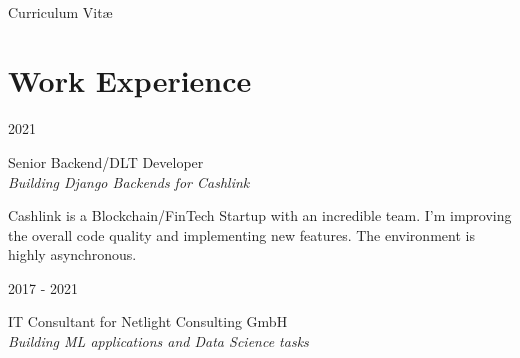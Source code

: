 \documentclass[a4paper,10pt]{article} %
\begin{document}
\color{text1} %


\par{\\ %
{\Huge \color{headings} Curriculum {Vit\ae}\\[15pt]\par}


\begin{minipage}[t]{0.5\textwidth}
\vspace{0pt} %


\section{Work Experience}

{\raggedleft\textsc{2021}\par}

{\raggedright\large Senior Backend/DLT Developer\\
\textit{Building Django Backends for Cashlink}\\[5pt]}

\normalsize{Cashlink is a Blockchain/FinTech Startup with an incredible team.
I'm improving the overall code quality and implementing new features. The 
environment is highly asynchronous.}\\


{\raggedleft\textsc{2017 - 2021}\par}

{\raggedright\large IT Consultant for Netlight Consulting GmbH\\
\textit{Building ML applications and Data Science tasks}\\[5pt]}


\end{minipage}}
\end{document}
